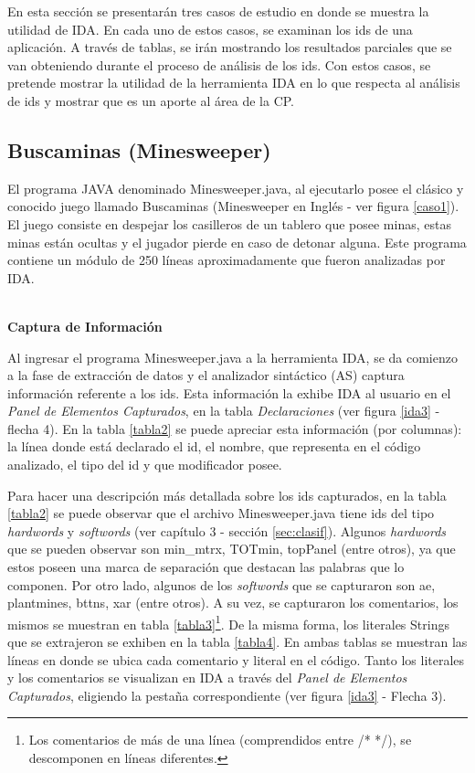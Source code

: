 En esta sección se presentarán tres casos de estudio en donde se muestra la utilidad de IDA. En cada uno de estos casos, se examinan los ids de una aplicación. A través de tablas, se irán mostrando los resultados parciales que se van obteniendo durante el proceso de análisis de los ids.
Con estos casos, se pretende mostrar la utilidad de la herramienta IDA en lo que respecta al análisis de ids y mostrar que es un aporte al área de la CP.

\subsection{Buscaminas (Minesweeper)}

El programa JAVA denominado Minesweeper.java, al ejecutarlo posee el clásico y conocido juego llamado Buscaminas (Minesweeper en Inglés - ver figura \ref{caso1}). El juego consiste en despejar los casilleros de un tablero que posee minas, estas minas están ocultas y el jugador pierde en caso de detonar alguna.
Este programa contiene un módulo de 250 líneas aproximadamente que fueron analizadas por IDA.

\noindent \textbf{\\Captura de Información\\} 

Al ingresar el programa Minesweeper.java a la herramienta IDA, se da comienzo a la fase de extracción de datos y el analizador sintáctico (AS) captura información referente a los ids. Esta información la exhibe IDA al usuario en el \textit{Panel de Elementos Capturados}, en la tabla \textit{Declaraciones} (ver figura \ref{ida3} - flecha 4). En la tabla \ref{tabla2} se puede apreciar esta información (por columnas): la línea donde está declarado el id, el nombre, que representa en el código analizado, el tipo del id y que modificador posee.

Para hacer una descripción más detallada sobre los ids capturados, en la tabla \ref{tabla2} se puede observar que el archivo \mbox{Minesweeper.java}
tiene ids del tipo \textit{hardwords} y \textit{softwords} (ver capítulo 3 - sección \ref{sec:clasif}). Algunos \textit{hardwords} que se pueden observar son \textsf{min\_mtrx}, \textsf{TOTmin}, \textsf{topPanel} (entre otros), ya que estos poseen una marca de separación que destacan las palabras que lo componen. Por otro lado, algunos de los \textit{softwords} que se capturaron son \textsf{ae}, \textsf{plantmines}, \textsf{bttns}, \textsf{xar} (entre otros).
A su vez, se capturaron los comentarios, los mismos se muestran en tabla \ref{tabla3}\footnote[1]{Los comentarios de más de una línea (comprendidos entre /* */), se descomponen en líneas diferentes.}. De la misma forma, los literales Strings que se extrajeron se exhiben en la tabla \ref{tabla4}. En ambas tablas se muestran las líneas en donde se ubica cada comentario y literal en el código.
Tanto los literales y los comentarios se visualizan en IDA a través del \textit{Panel de Elementos Capturados}, eligiendo la pestaña correspondiente (ver figura \ref{ida3} - Flecha 3).

